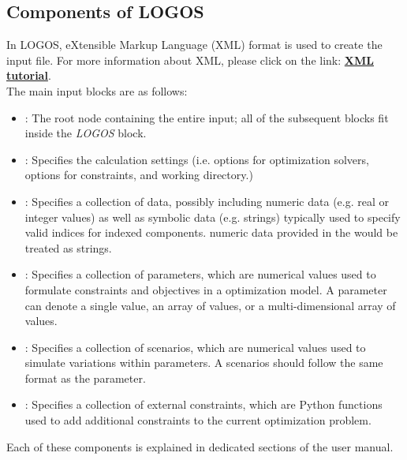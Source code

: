 \subsection{Components of LOGOS}
In LOGOS, eXtensible Markup Language (XML) format is used to create the input file.
For more information about XML, please click on the link:
\href{https://www.w3schools.com/xml/default.asp}{\textbf{XML tutorial}}.
%
\\The main input blocks are as follows:
\begin{itemize}
  \item {}: The root node containing the
  entire input; all of
  the subsequent blocks fit inside the \emph{LOGOS} block.
  \item {}: Specifies the calculation settings (i.e. options for
	optimization solvers, options for constraints, and working directory.)
  \item {}: Specifies a collection of data, possibly including
	numeric data (e.g. real or integer values) as well as symbolic data (e.g. strings)
	typically used to specify valid indices for indexed components.
	\nb numeric data provided in the  would be treated as strings.
	\item {}: Specifies a collection of parameters, which are
  numerical values used to formulate constraints and objectives in a
	optimization model. A parameter can denote a single value, an array of values, or a multi-dimensional
	array of values.
	\item {}: Specifies a collection of scenarios, which are
	numerical values used to simulate variations within parameters. A scenarios should follow
	the same format as the parameter.
	\item {}: Specifies a collection of external constraints, which are
  Python functions used to add additional constraints to the
	current optimization problem.
\end{itemize}

Each of these components is explained in dedicated sections of the user manual.

